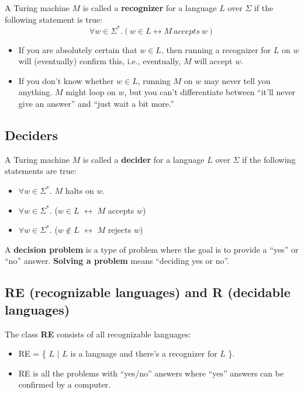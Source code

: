 \documentclass[12pt, letterpaper, oneside]{book}
\begin{document}
A Turing machine $M$ is called a \textbf{recognizer} for a language $L$ over $\Sigma$ if the following statement is
true: \[ \forall w \in \Sigma^*. (w \in L \leftrightarrow M \ accepts \ w) \]

\begin{itemize}
  \item If you are absolutely certain that $w \in L$, then running a recognizer for $L$ on $w$ will (eventually)
        confirm this, i.e., eventually, $M$ will accept $w$.
  \item If you don't know whether $w \in L$, running $M$ on $w$ may never tell you anything. $M$ might loop on $w$, but
        you can't differentiate between ``it'll never give an answer'' and ``just wait a bit more.''
\end{itemize}

\subsection{Deciders}

A Turing machine $M$ is called a \textbf{decider} for a language $L$ over $\Sigma$ if the following statements are
true:
\begin{itemize}
  \item $\forall w \in \Sigma^*$. $M$ halts on $w$.
  \item $\forall w \in \Sigma^*$. ($w \in L$ $\leftrightarrow$ $M$ accepts $w$)
  \item $\forall w \in \Sigma^*$. ($w \notin L$ $\leftrightarrow$ $M$ rejects $w$)
\end{itemize}

A \textbf{decision problem} is a type of problem where the goal is to provide a ``yes'' or ``no'' answer.
\textbf{Solving a problem} means ``deciding yes or no''.

\subsection{RE (recognizable languages) and R (decidable languages)}

The class \textbf{RE} consists of all recognizable languages:
\begin{itemize}
  \item RE = \{ $L$ $|$ $L$ is a language and there's a recognizer for $L$ \}.
  \item RE is all the problems with ``yes/no'' answers where ``yes'' answers can be confirmed by a computer.
\end{itemize}
\end{document}
